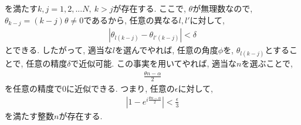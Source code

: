 \begin{ex}
    を満たす$k,j = 1, 2, ... N, \ k > j$が存在する. ここで, $\theta$が無理数なので, $\theta_{k-j} = (k-j) \theta \neq 0$であるから, 任意の異なる$l, l'$に対して,
    \begin{align*}
        \left| \theta_{l(k-j)} - \theta_{l'(k-j)} \right| < \delta
    \end{align*}
    とできる. したがって, 適当な$l$を選んでやれば, 任意の角度$\phi$を, $\theta_{l(k-j)}$とすることで, 任意の精度$\delta$で近似可能. この事実を用いてやれば, 適当な$n$を選ぶことで,
    \begin{align*}
        \frac{ \theta n  - \alpha}{2}
    \end{align*}
    を任意の精度で$0$に近似できる. つまり, 任意の$\epsilon$に対して,
    \begin{align*}
        \left| 1 - e^{i \frac{ \theta n  - \alpha}{2}} \right| < \frac{\epsilon}{3}
    \end{align*}
    を満たす整数$n$が存在する.
\end{ex}


